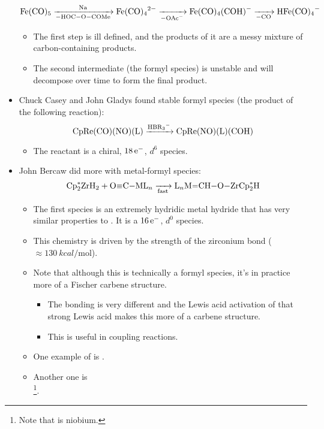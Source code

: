 \documentclass[../notes.tex]{subfiles}
\begin{document}
\begin{itemize}
\begin{equation*}
        \ce{Fe(CO)5 ->[Na][-HOC-O-COMe] Fe(CO)4^2- ->[][-OAc^-] Fe(CO)4(COH)- ->[][-CO] HFe(CO)4-}
    \end{equation*}
    \begin{itemize}
        \item The first step is ill defined, and the products of it are a messy mixture of carbon-containing products.
        \item The second intermediate (the formyl species) is unstable and will decompose over time to form the final product.
    \end{itemize}
    \item Chuck Casey and John Gladys found stable formyl species (the product of the following reaction):
    \begin{equation*}
        \ce{CpRe(CO)(NO)(L) ->[HBR3^-] CpRe(NO)(L)(COH)}
    \end{equation*}
    \begin{itemize}
        \item The reactant is a chiral, $18\,\e[-]$, $d^6$ species.
    \end{itemize}
    \item John Bercaw did more with metal-formyl species:
    \begin{equation*}
        \ce{Cp^*2ZrH2 + O#C-ML_n ->[][fast] L_nM=CH-O-ZrCp^*2H}
    \end{equation*}
    \begin{itemize}
        \item The first species is an extremely hydridic metal hydride that has very similar properties to . It is a $16\,\e[-]$, $d^0$ species.
        \item This chemistry is driven by the strength of the zirconium bond ($\approx\SI{130}{kcal\per\mole}$).
        \item Note that although this is technically a formyl species, it's in practice more of a Fischer carbene structure.
        \begin{itemize}
            \item The bonding is very different and the Lewis acid activation of that strong  Lewis acid makes this more of a carbene structure.
            \item This is useful in  coupling reactions.
        \end{itemize}
        \item One example of  is .
        \item Another one is \\ \footnote{Note that  is niobium.}.

\end{itemize}
\end{itemize}
\end{document}
